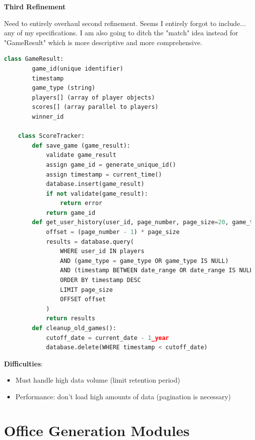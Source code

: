 \documentclass[12pt]{article}
\begin{document}
\textbf{Third Refinement}

Need to entirely overhaul second refinement. Seems I entirely forgot to include... any of my specifications. 
I am also going to ditch the "match" idea instead for "GameResult" which is more descriptive and more comprehensive.

\begin{lstlisting}[language=Python]
    class GameResult:
        game_id(unique identifier)
        timestamp
        game_type (string)
        players[] (array of player objects)
        scores[] (array parallel to players)
        winner_id
    
    class ScoreTracker:
        def save_game (game_result):
            validate game_result
            assign game_id = generate_unique_id()
            assign timestamp = current_time()
            database.insert(game_result)
            if not validate(game_result):
                return error
            return game_id
        def get_user_history(user_id, page_number, page_size=20, game_type=None, date_range=None):
            offset = (page_number - 1) * page_size
            results = database.query(
                WHERE user_id IN players
                AND (game_type = game_type OR game_type IS NULL)
                AND (timestamp BETWEEN date_range OR date_range IS NULL)
                ORDER BY timestamp DESC
                LIMIT page_size
                OFFSET offset
            )
            return results
        def cleanup_old_games():
            cutoff_date = current_date - 1_year
            database.delete(WHERE timestamp < cutoff_date)
\end{lstlisting}

\textbf{Difficulties}:
\begin{itemize}
    \item Must handle high data volume (limit retention period)
    \item Performance: don't load high amounts of data (pagination is necessary)
\end{itemize}

\section{Office Generation Modules}
\end{document}

